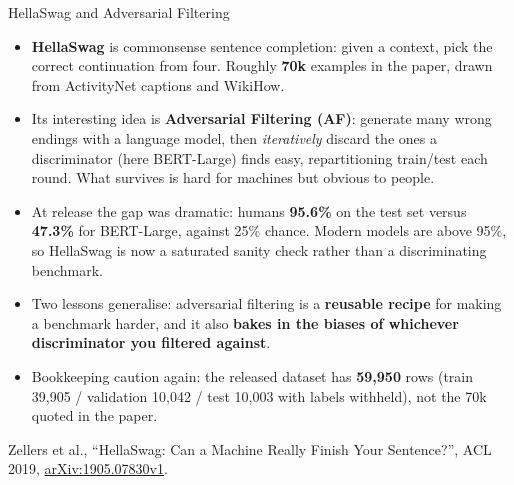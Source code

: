 \begin{frame}[allowframebreaks]{HellaSwag and Adversarial Filtering}
  \begin{itemize}\itemsep0.35em
    \item[\textcolor{red}{$\blacktriangleright$}] \textbf{HellaSwag} is commonsense sentence completion: given a context, pick the correct continuation from four. Roughly \textbf{70k} examples in the paper, drawn from ActivityNet captions and WikiHow.
    \item[\textcolor{red}{$\blacktriangleright$}] Its interesting idea is \textbf{Adversarial Filtering (AF)}: generate many wrong endings with a language model, then \textit{iteratively} discard the ones a discriminator (here BERT-Large) finds easy, repartitioning train/test each round. What survives is hard for machines but obvious to people.
    \item[\textcolor{red}{$\blacktriangleright$}] At release the gap was dramatic: humans \textbf{95.6\%} on the test set versus \textbf{47.3\%} for BERT-Large, against 25\% chance. Modern models are above 95\%, so HellaSwag is now a saturated sanity check rather than a discriminating benchmark.
    \item[\textcolor{red}{$\blacktriangleright$}] Two lessons generalise: adversarial filtering is a \textbf{reusable recipe} for making a benchmark harder, and it also \textbf{bakes in the biases of whichever discriminator you filtered against}.
    \item[\textcolor{red}{$\blacktriangleright$}] Bookkeeping caution again: the released dataset has \textbf{59{,}950} rows (train 39{,}905 / validation 10{,}042 / test 10{,}003 with labels withheld), not the 70k quoted in the paper.
  \end{itemize}
  \vspace{0.15em}
  {\scriptsize Zellers et al., ``HellaSwag: Can a Machine Really Finish Your Sentence?'', ACL 2019, \href{https://arxiv.org/abs/1905.07830v1}{arXiv:1905.07830v1}.}
\end{frame}

